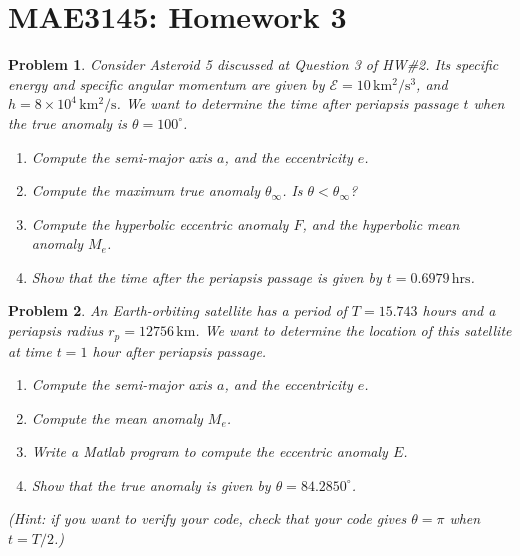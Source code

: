 \documentclass[10pt]{article}
\date{}
\theoremstyle{plain}\theorembodyfont{\normalfont}
\newtheorem{prob}{Problem}[section]
\newenvironment{subprob}%
{\renewcommand{\theenumi}{\alph{enumi}}\renewcommand{\labelenumi}{(\theenumi)}\begin{enumerate}}%
{\end{enumerate}}%
\begin{document}
\pagestyle{empty}
\section*{MAE3145: Homework 3}
\vspace*{-0.4cm}


\begin{prob}
Consider Asteroid 5 discussed at Question 3 of HW\#2. Its specific energy and specific angular momentum are given by $\mathcal{E}=10\,\mathrm{km^2/s^3}$, and $h=8\times 10^4\,\mathrm{km^2/s}$. We want to determine the time after periapsis passage $t$ when the true anomaly is $\theta=100^\circ$.
\begin{subprob}
\item Compute the semi-major axis $a$, and the eccentricity $e$.
\item Compute the maximum true anomaly $\theta_\infty$. Is $\theta < \theta_\infty$?
\item Compute the hyperbolic eccentric anomaly $F$, and the hyperbolic mean anomaly $M_e$.
\item Show that the time after the periapsis passage is given by $t=0.6979\,\mathrm{hrs}$.
\end{subprob}
\end{prob}

\begin{prob}
An Earth-orbiting satellite has a period of $T=15.743$ hours and a periapsis radius $r_p=12756\,\mathrm{km}$. We want to determine the location of this satellite at time $t=1$ hour after periapsis passage.
\begin{subprob}
\item Compute the semi-major axis $a$, and the eccentricity $e$.
\item Compute the mean anomaly $M_e$.
\item Write a Matlab program to compute the eccentric anomaly $E$.
\item Show that the true anomaly is given by $\theta=84.2850^\circ$.
\end{subprob}
(Hint: if you want to verify your code, check that your code gives $\theta=\pi$ when $t=T/2$.)
\end{prob}
\end{document}
